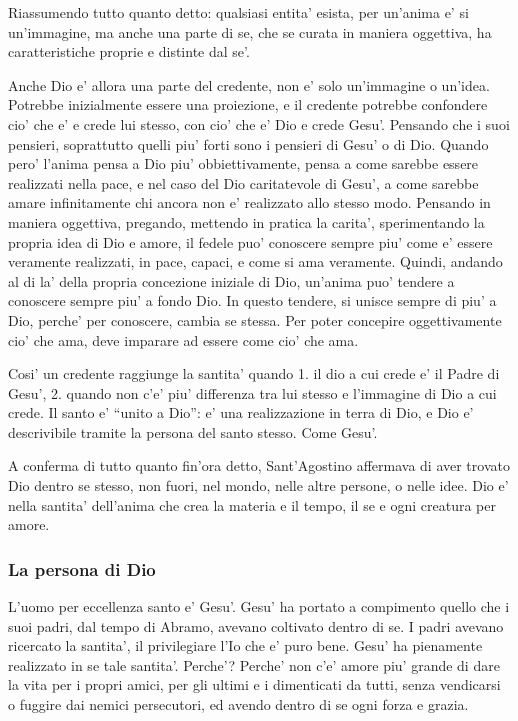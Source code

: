 Riassumendo tutto quanto detto: qualsiasi entita' esista, per un'anima e' si un'immagine, ma anche una parte di se, che se curata in maniera oggettiva, ha caratteristiche proprie e distinte dal se'.

Anche Dio e' allora una parte del credente, non e' solo un'immagine o un'idea. Potrebbe inizialmente essere una proiezione, e il credente potrebbe confondere cio' che e' e crede lui stesso, con cio' che e' Dio e crede Gesu'. Pensando che i suoi pensieri, soprattutto quelli piu' forti sono i pensieri di Gesu' o di Dio.
Quando pero' l'anima pensa a Dio piu' obbiettivamente, pensa a come sarebbe essere realizzati nella pace, e nel caso del Dio caritatevole di Gesu', a come sarebbe amare infinitamente chi ancora non e' realizzato allo stesso modo. Pensando in maniera oggettiva, pregando, mettendo in pratica la carita', sperimentando la propria idea di Dio e amore, il fedele puo' conoscere sempre piu' come e' essere veramente realizzati, in pace, capaci, e come si ama veramente. Quindi, andando al di la' della propria concezione iniziale di Dio, un'anima puo' tendere a conoscere sempre piu' a fondo Dio. In questo tendere, si unisce sempre di piu' a Dio, perche' per conoscere, cambia se stessa. Per poter concepire oggettivamente cio' che ama, deve imparare ad essere come cio' che ama.

Cosi' un credente raggiunge la santita' quando 1. il dio a cui crede e' il Padre di Gesu', 2. quando non c'e' piu' differenza tra lui stesso e l'immagine di Dio a cui crede. Il santo e' ``unito a Dio'': e' una realizzazione in terra di Dio, e Dio e' descrivibile tramite la persona del santo stesso. Come Gesu'. 


A conferma di tutto quanto fin'ora detto, Sant'Agostino affermava di aver trovato Dio dentro se stesso, non fuori, nel mondo, nelle altre persone, o nelle idee. Dio e' nella santita' dell'anima che crea la materia e il tempo, il se e ogni creatura per amore.

\subsubsection{La persona di Dio}

L'uomo per eccellenza santo e' Gesu'. Gesu' ha portato a compimento quello che i suoi padri, dal tempo di Abramo, avevano coltivato dentro di se. I padri avevano ricercato la santita', il privilegiare l'Io che e' puro bene. Gesu' ha pienamente realizzato in se tale santita'. Perche'? Perche' non c'e' amore piu' grande di dare la vita per i propri amici, per gli ultimi e i dimenticati da tutti, senza vendicarsi o fuggire dai nemici persecutori, ed avendo dentro di se ogni forza e grazia.

